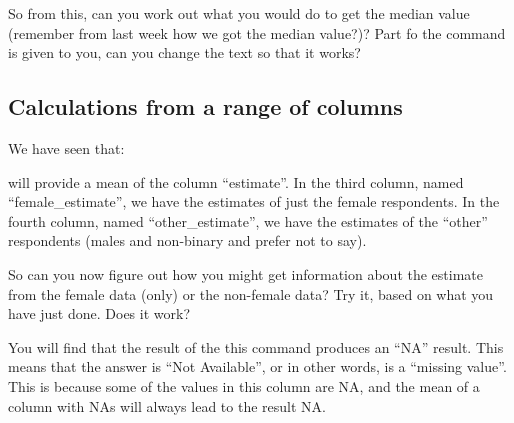 \documentclass[
]{book}
\newenvironment{Shaded}{\begin{snugshade}}{\end{snugshade}}
\newcommand{\FunctionTok}[1]{\textcolor[rgb]{0.00,0.00,0.00}{#1}}
\newcommand{\NormalTok}[1]{#1}
\newcommand{\SpecialCharTok}[1]{\textcolor[rgb]{0.00,0.00,0.00}{#1}}
\begin{document}
\begin{Shaded}
\end{Shaded}

\begin{Shaded}
\end{Shaded}

So from this, can you work out what you would do to get the median value (remember from last week how we got the median value?)? Part fo the command is given to you, can you change the text so that it works?

\hypertarget{calculations-from-a-range-of-columns}{%
\subsection{Calculations from a range of columns}\label{calculations-from-a-range-of-columns}}

We have seen that:

\begin{Shaded}
\end{Shaded}

will provide a mean of the column ``estimate''. In the third column, named ``female\_estimate'', we have the estimates of just the female respondents. In the fourth column, named ``other\_estimate'', we have the estimates of the ``other'' respondents (males and non-binary and prefer not to say).

So can you now figure out how you might get information about the estimate from the female data (only) or the non-female data? Try it, based on what you have just done. Does it work?

You will find that the result of the this command produces an ``NA'' result. This means that the answer is ``Not Available'', or in other words, is a ``missing value''. This is because some of the values in this column are NA, and the mean of a column with NAs will always lead to the result NA.
\end{document}
